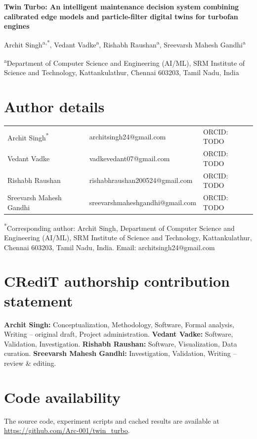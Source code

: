 \documentclass[11pt]{article}
\begin{document}
{\Large\bfseries Twin Turbo: An intelligent maintenance decision system combining calibrated edge models and particle-filter digital twins for turbofan engines\par}

\bigskip
Archit Singh\textsuperscript{a,*},
Vedant Vadke\textsuperscript{a},
Rishabh Raushan\textsuperscript{a},
Sreevarsh Mahesh Gandhi\textsuperscript{a}

\textsuperscript{a}Department of Computer Science and Engineering (AI/ML), SRM Institute of Science and Technology, Kattankulathur, Chennai 603203, Tamil Nadu, India

\section*{Author details}
\begin{tabular}{@{}lll@{}}
Archit Singh\textsuperscript{*} & architsingh24@gmail.com & ORCID: TODO \\
Vedant Vadke & vadkevedant07@gmail.com & ORCID: TODO \\
Rishabh Raushan & rishabhraushan200524@gmail.com & ORCID: TODO \\
Sreevarsh Mahesh Gandhi & sreevarshmaheshgandhi@gmail.com & ORCID: TODO \\
\end{tabular}

\textsuperscript{*}Corresponding author: Archit Singh, Department of Computer Science and Engineering (AI/ML), SRM Institute of Science and Technology, Kattankulathur, Chennai 603203, Tamil Nadu, India. Email: architsingh24@gmail.com

\section*{CRediT authorship contribution statement}
\textbf{Archit Singh:} Conceptualization, Methodology, Software, Formal analysis, Writing -- original draft, Project administration.
\textbf{Vedant Vadke:} Software, Validation, Investigation.
\textbf{Rishabh Raushan:} Software, Visualization, Data curation.
\textbf{Sreevarsh Mahesh Gandhi:} Investigation, Validation, Writing -- review \& editing.

\section*{Code availability}
The source code, experiment scripts and cached results are available at \url{https://github.com/Arc-001/twin_turbo}.
\end{document}
